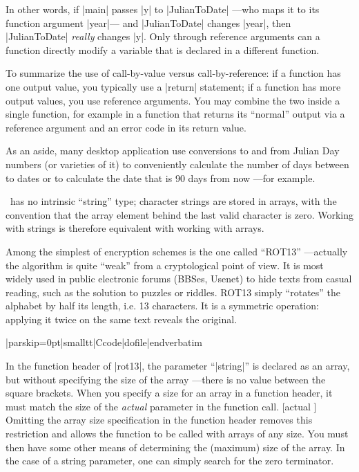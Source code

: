 In other words, if |main| passes |y| to |JulianToDate| ---who maps it to its
function argument |year|--- and |JulianToDate| changes |year|, then |JulianToDate|
{\it really\/} changes |y|. Only through reference arguments can a function
directly modify a variable that is declared in a different function.

To summarize the use of call-by-value versus call-by-reference: if a function
has one output value, you typically use a |return| statement; if a function
has more output values, you use reference arguments. You may combine the two
inside a single function, for example in a function that returns its
``normal'' output via a reference argument and an error code in its return
value.

As an aside, many desktop application use conversions to and from Julian Day
numbers (or varieties of it) to conveniently calculate the number of days
between to dates or to calculate the date that is 90 days from now ---for example.

\dingbatseparator


\Small\ has no intrinsic ``string'' type; character strings are stored in arrays,
with the convention that the array element behind the last valid character
is zero. Working with strings is therefore equivalent with working with arrays.

Among the simplest of encryption schemes is the one called ``ROT13''
---actually the algorithm is quite ``weak'' from a cryptological point of view.
It is most widely used in public electronic forums (BBSes, Usenet) to hide texts
from casual reading, such as the solution to puzzles or riddles. ROT13 simply
``rotates'' the alphabet by half its length, i.e. 13 characters. It is a
symmetric operation: applying it twice on the same text reveals the original.

  
\bigskip{}
\verbatim|parskip=0pt|smalltt|Ccode|dofile|endverbatim\endlistingx

In the function header of |rot13|, the parameter ``|string|'' is declared as
an array, but without specifying the size of the array ---there is no value
between the square brackets. When you specify a size for an array in a function
header, it must match the size of the {\it actual\/} parameter in the function
call. [actual \midtilde]
Omitting the array size specification in the function header removes this
restriction and allows the function to be called with arrays of any size. You
must then have some other means of determining the (maximum) size of the
array. In the case of a string parameter, one can simply search for the zero
terminator.

